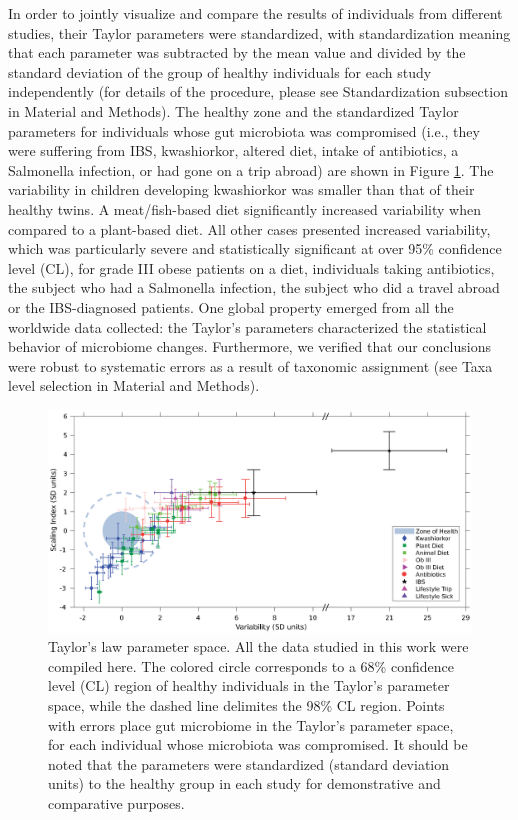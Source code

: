 In order to jointly visualize and compare the results of individuals from different studies\cite{IBS,moving,antibiotic,LEA,kwashiorkor,diet,hostlife}, their Taylor parameters were standardized, with standardization meaning that each parameter was subtracted by the mean value and divided by the standard deviation of the group of healthy individuals for each study independently (for details of the procedure, please see Standardization subsection in Material and Methods). The healthy zone and the standardized Taylor parameters for individuals whose gut microbiota was compromised (i.e., they were suffering from IBS, kwashiorkor, altered diet, intake of antibiotics, a Salmonella infection, or had gone on a trip abroad) are shown in Figure \ref{fig:main2}. The variability in children developing kwashiorkor was smaller than that of their healthy twins. A meat/fish-based diet significantly increased variability when compared to a plant-based diet. All other cases presented increased variability, which was particularly severe and statistically significant at over 95\% confidence level (CL), for grade III obese patients on a diet, individuals taking antibiotics, the subject who had a Salmonella infection, the subject who did a travel abroad or the IBS-diagnosed patients. One global property emerged from all the worldwide data collected: the Taylor's parameters characterized the statistical behavior of microbiome changes. Furthermore, we verified that our conclusions were robust to systematic errors as a result of taxonomic assignment (see Taxa level selection in Material and Methods).

\begin{figure}
	\centering
	\includegraphics[width=1.0\textwidth]{figs/Fig2.eps}
	\caption{Taylor's law parameter space. All the data studied in this work were compiled here. The colored circle corresponds to a 68\% confidence level (CL) region of healthy individuals in the Taylor's parameter space, while the dashed line delimites the 98\% CL region. Points with errors place gut microbiome in the Taylor's parameter space, for each individual whose microbiota was compromised. It should be noted that the parameters were standardized (standard deviation units) to the healthy group in each study for demonstrative and comparative purposes.}
	\label{fig:main2}
\end{figure}

